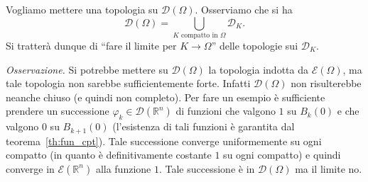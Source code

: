 \documentclass[italian,a4paper,oneside,headinclude]{scrbook}
\renewcommand{\phi}{\varphi}
\newcommand{\D}{\mathcal D}
\newcommand{\E}{\mathcal E}
\newcommand{\RR}{\mathbb R}
\begin{document}
Vogliamo mettere una topologia su $\D(\Omega)$.
Osserviamo che si ha
\[
\D(\Omega)=\bigcup_{\text{$K$ compatto in $\Omega$}} \D_K.
\]
Si tratterà dunque di ``fare il
limite per $K\to \Omega$'' delle topologie sui $\D_K$.

\emph{Osservazione.} Si potrebbe mettere su $\D(\Omega)$ la topologia
indotta da $\E(\Omega)$, ma tale topologia non sarebbe
sufficientemente forte. Infatti $\D(\Omega)$ non risulterebbe neanche
chiuso (e quindi non completo). Per fare un esempio è sufficiente
prendere un successione $\phi_k \in \D(\RR^n)$ di funzioni che valgono
$1$ su $B_k(0)$ e che valgono $0$ su $B_{k+1}(0)$ (l'esistenza di tali
funzioni è garantita dal teorema~\ref{th:fun_cpt}).
Tale successione converge uniformemente su ogni compatto (in quanto è
definitivamente costante $1$ su ogni compatto) e quindi
converge in $\E(\RR^n)$ alla funzione $1$.
Tale successione è in $\D(\Omega)$ ma il limite no.
\end{document}
